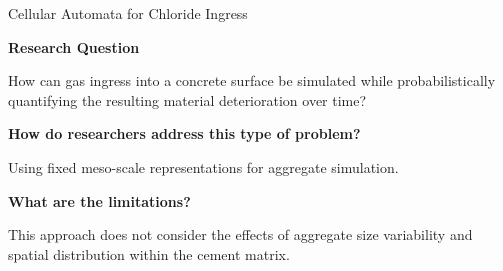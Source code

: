 \begin{frame}{Cellular Automata for Chloride Ingress}

\justifying

\textbf{Research Question}

How can gas ingress into a concrete surface be simulated while probabilistically
quantifying the resulting material deterioration over time?

\vspace{0.20cm}

\textbf{How do researchers address this type of problem?}

Using fixed meso-scale representations for aggregate simulation.

\vspace{0.20cm}

\textbf{What are the limitations?}

This approach does not consider the effects of aggregate size variability
and spatial distribution within the cement matrix.

\end{frame}
